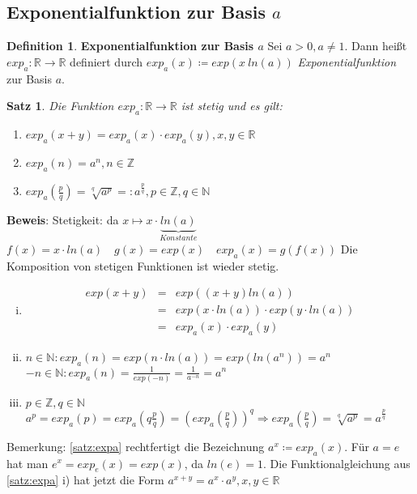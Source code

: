 \documentclass[ngerman,titlepage,twoside, parskip=half*]{scrreprt}
\newcommand*{\N}{\mathbb{N}}
\newcommand*{\Z}{\mathbb{Z}}
\newcommand*{\R}{\mathbb{R}}
\theoremstyle{plain}
\newtheorem{theorem}{Satz}[section]
\theoremstyle{definition}
\newtheorem{definition}{Definition}
\theoremstyle{remark}
\begin{document}
\subsection{Exponentialfunktion zur Basis \texorpdfstring{$a$}{a}}

\begin{definition}
\textbf{Exponentialfunktion zur Basis $a$} Sei $a>0, a\neq 1$. Dann heißt $exp_a \colon\R\rightarrow\R$ definiert durch $exp_a (x)\coloneqq
exp(x\ ln (a))$ \emph{Exponentialfunktion} zur Basis $a$.
\end{definition}

\begin{theorem}
\label{satz:expa}
Die Funktion $exp_a \colon\R\rightarrow\R$ ist stetig und es gilt:
\begin{enumerate}[i]
  \item $exp_a(x+y)=exp_a(x)\cdot exp_a(y), x,y \in \R$
  \item $exp_a(n)=a^n, n\in \Z$
  \item $exp_a (\frac{p}{q})=\sqrt[q]{a^p}=:a^{\frac{p}{q}}, p\in \Z , q\in \N$
\end{enumerate}
\end{theorem}
\textbf{Beweis}: Stetigkeit: da $x \mapsto x \cdot \underbrace{ln (a)}_{Konstante}$\\
$f(x)=x\cdot ln(a)\quad g(x)=exp(x)\quad exp_a(x)=g(f(x))$ Die Komposition von stetigen Funktionen ist wieder stetig.
\begin{enumerate}[i)]
  \item \begin{align*}
    exp(x+y) & = & exp((x+y)ln (a))\\
    & = & exp(x \cdot ln (a))\cdot exp(y\cdot ln(a))\\
    & = & exp_a(x)\cdot exp_a(y)
  \end{align*}
  \item $n\in \N\colon exp_a (n)=exp(n\cdot ln(a))=exp(ln(a^n))=a^n$\\
    $-n\in \N\colon exp_a(n)=\frac{1}{exp(-n)}=\frac{1}{a^{-n}}=a^n$
  \item $p\in \Z, q\in \N$\\
    $a^p=exp_a(p)=exp_a(q\frac{p}{q})=\left(exp_a(\frac{p}{q})\right)^q\Rightarrow exp_a(\frac{p}{q})=\sqrt[q]{a^p}=a^{\frac{p}{q}}$
\end{enumerate}

Bemerkung: \autoref{satz:expa} rechtfertigt die Bezeichnung $a^x\coloneqq exp_a(x)$. Für $a=e$ hat man $e^x=exp_e(x)=exp(x)$, 
da $ln(e)=1$. Die Funktionalgleichung aus \autoref{satz:expa} i) hat jetzt die Form $a^{x+y}=a^x\cdot a^y, x,y\in \R$
\end{document}
